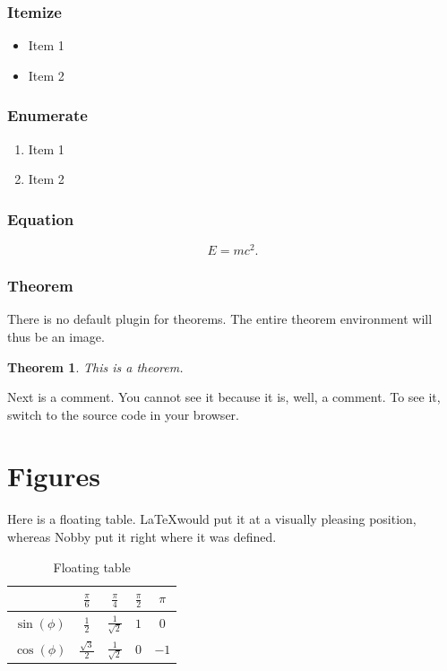 \documentclass[10pt]{article}
\newtheorem{theorem}{Theorem}
\begin{document}
\subsubsection{Itemize}
\begin{itemize}
\item Item 1
\item Item 2
\end{itemize}

\subsubsection{Enumerate}
\begin{enumerate}
\item Item 1
\item Item 2
\end{enumerate}

\subsubsection{Equation}
\begin{equation}
  \label{eq:rel}
  E = mc^2.
\end{equation}

\subsubsection{Theorem}
There is no default plugin for theorems. The entire theorem
environment will thus be an image.
\begin{theorem}
  This is a theorem.
\end{theorem}

Next is a comment. You cannot see it because it is, well, a
comment. To see it, switch to the source code in your browser.

\section{Figures}
Here is a floating table. \LaTeX would put it at a visually pleasing
position, whereas Nobby put it right where it was defined.
\begin{table}
  \centering
  \begin{tabular}{c | c c c c}
    & $\frac{\pi}{6}$& $\frac{\pi}{4}$& $\frac{\pi}{2}$ & $\pi$\\[1mm]
    \hline
    \rule{0cm}{4mm}$\sin(\phi)$& $\frac{1}{2}$ & $\frac{1}{\sqrt{2}}$& $1$ & $0$\\
    \rule{0cm}{4mm}$\cos(\phi)$& $\frac{\sqrt{3}}{2}$ & $\frac{1}{\sqrt{2}}$& $0$&$-1$
  \end{tabular}
  \caption{Floating table}
\end{table}
\end{document}

